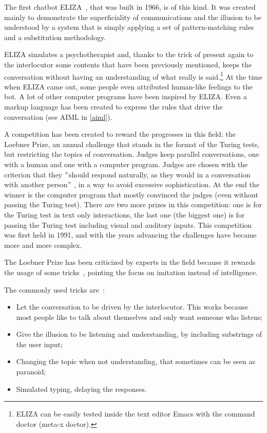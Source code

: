 The first chatbot ELIZA~\cite{weizenbaum1966eliza}, that was built in 1966, is of this kind. It was created mainly to demonstrate the superficiality of communications and the illusion to be understood by a system that is simply applying a set of pattern-matching rules and a substitution methodology.

ELIZA simulates a psychotherapist and, thanks to the trick of present again to the interlocutor some contents that have been previously mentioned, keeps the conversation without having an understanding of what really is said.\footnote{ ELIZA can be easily tested inside the text editor Emacs with the command doctor (meta-x doctor). } At the time when ELIZA came out, some people even attributed human-like feelings to the bot. A lot of other computer programs have been inspired by ELIZA. Even a markup language has been created to express the rules that drive the conversation (see AIML in \ref{aiml}).

A competition has been created to reward the progresses in this field: the Loebner Prize, an annual challenge that stands in the format of the Turing tests, but restricting the topics of conversation. Judges keep parallel conversations, one with a human and one with a computer program. Judges are chosen with the criterion that they $``$should respond naturally, as they would in a conversation with another person$"$ , in a way to avoid excessive sophistication. At the end the winner is the computer program that mostly convinced the judges (even without passing the Turing test). There are two more prizes in this competition: one is for the Turing test in text only interactions, the last one (the biggest one) is for passing the Turing test including visual and auditory inputs. This competition was first held in 1991, and with the years advancing the challenges have became more and more complex.

The Loebner Prize has been criticized by experts in the field because it rewards the usage of some tricks~\cite{shieber1994lessons}, pointing the focus on imitation instead of intelligence.

The commonly used tricks are~\cite{mauldin1994chatterbots}:

\begin{itemize}
	\item Let the conversation to be driven by the interlocutor. This works because most people like to talk about themselves and only want someone who listens;

	\item Give the illusion to be listening and understanding, by including substrings of the user input;

	\item Changing the topic when not understanding, that sometimes can be seen as paranoid;

	\item Simulated typing, delaying the responses.
\end{itemize}

